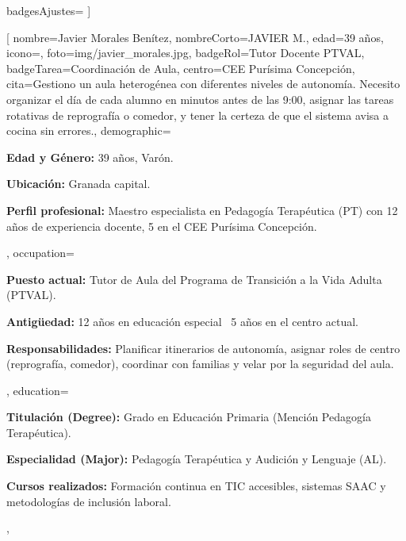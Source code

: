 \documentclass[10pt]{article}
\begin{document}
    badgesAjustes={%
         \hspace{2mm}
         \hspace{2mm}
         \hspace{2mm}
    }%
]

\fichaAdulto[%
    nombre={Javier Morales Benítez},
    nombreCorto={JAVIER M.},
    edad={39 años},
    icono={\faChalkboardTeacher},
    foto={img/javier_morales.jpg},
    badgeRol={Tutor Docente PTVAL},
    badgeTarea={Coordinación de Aula},
    centro={CEE Purísima Concepción},
    cita={Gestiono un aula heterogénea con diferentes niveles de autonomía. Necesito organizar el día de cada alumno en minutos antes de las 9:00, asignar las tareas rotativas de reprografía o comedor, y tener la certeza de que el sistema avisa a cocina sin errores.},
    demographic={%
        \item \textbf{Edad y Género:} 39 años, Varón.
        \item \textbf{Ubicación:} Granada capital.
        \item \textbf{Perfil profesional:} Maestro especialista en Pedagogía Terapéutica (PT) con 12 años de experiencia docente, 5 en el CEE Purísima Concepción.
    },
    occupation={%
        \item \textbf{Puesto actual:} Tutor de Aula del Programa de Transición a la Vida Adulta (PTVAL).
        \item \textbf{Antigüedad:} 12 años en educación especial \textbar\ 5 años en el centro actual.
        \item \textbf{Responsabilidades:} Planificar itinerarios de autonomía, asignar roles de centro (reprografía, comedor), coordinar con familias y velar por la seguridad del aula.
    },
    education={%
        \item \textbf{Titulación (Degree):} Grado en Educación Primaria (Mención Pedagogía Terapéutica).
        \item \textbf{Especialidad (Major):} Pedagogía Terapéutica y Audición y Lenguaje (AL).
        \item \textbf{Cursos realizados:} Formación continua en TIC accesibles, sistemas SAAC y metodologías de inclusión laboral.
    },
\end{document}
